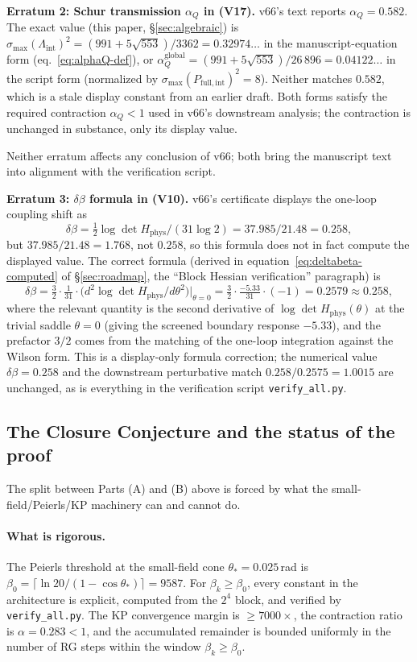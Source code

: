\documentclass[11pt]{article}
\theoremstyle{definition}
\begin{document}
\textbf{Erratum 2: Schur transmission $\alpha_Q$ in (V17).}  v66's
text reports $\alpha_Q=0.582$.  The exact value (this paper,
\S\ref{sec:algebraic}) is
$\sigma_{\max}(\Lambda_{\mathrm{int}})^2=(991+5\sqrt{553})/3362
=0.32974\ldots$ in the manuscript-equation form
(eq.~\ref{eq:alphaQ-def}), or
$\alpha_Q^{\mathrm{global}}=(991+5\sqrt{553})/26\,896=0.04122\ldots$
in the script form (normalized by
$\sigma_{\max}(P_{\mathrm{full,int}})^2=8$).  Neither matches
$0.582$, which is a stale display constant from an earlier draft.
Both forms satisfy the required contraction $\alpha_Q<1$ used in
v66's downstream analysis; the contraction is unchanged in
substance, only its display value.

Neither erratum affects any conclusion of v66; both bring the
manuscript text into alignment with the verification script.

\textbf{Erratum 3: $\delta\beta$ formula in (V10).}  v66's certificate
displays the one-loop coupling shift as
\[
\delta\beta=\tfrac{1}{2}\log\det H_{\mathrm{phys}}/(31\log 2)
=37.985/21.48=0.258,
\]
but $37.985/21.48=1.768$, not $0.258$, so this formula does not in
fact compute the displayed value.  The correct formula \textup{(}derived
in equation~\eqref{eq:deltabeta-computed} of \S\ref{sec:roadmap}, the
``Block Hessian verification'' paragraph\textup{)} is
\[
\delta\beta = \tfrac{3}{2}\cdot\tfrac{1}{31}\cdot
\bigl(d^2\log\det H_{\mathrm{phys}}/d\theta^2\bigr)\big|_{\theta=0}
= \tfrac{3}{2}\cdot\tfrac{-5.33}{31}\cdot(-1) = 0.2579\approx 0.258,
\]
where the relevant quantity is the second derivative of $\log\det
H_{\mathrm{phys}}(\theta)$ at the trivial saddle $\theta=0$ \textup{(}giving
the screened boundary response $-5.33$\textup{)}, and the prefactor
$3/2$ comes from the matching of the one-loop integration against
the Wilson form.  This is a display-only formula correction; the
numerical value $\delta\beta=0.258$ and the downstream perturbative
match $0.258/0.2575=1.0015$ are unchanged, as is everything in the
verification script \texttt{verify\_all.py}.

\subsection{The Closure Conjecture and the status of the proof}%
\label{subsec:status}

The split between Parts (A) and (B) above is forced by what the
small-field/Peierls/KP machinery can and cannot do.

\paragraph{What is rigorous.}
The Peierls threshold at the small-field cone $\theta_*=0.025$\,rad
is $\beta_0=\lceil\ln 20/(1-\cos\theta_*)\rceil=9587$.  For
$\beta_k\ge\beta_0$, every constant in the architecture is
explicit, computed from the $2^4$ block, and verified by
\texttt{verify\_all.py}.  The KP convergence margin is
$\ge 7000\times$, the contraction ratio is $\alpha=0.283<1$,
and the accumulated remainder is bounded uniformly in the number
of RG steps within the window $\beta_k\ge\beta_0$.
\end{document}
